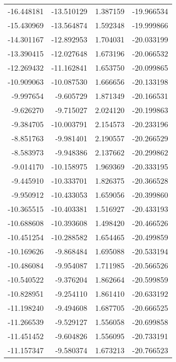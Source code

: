\begin{tabular}{rrrr}
      -16.448181 &       -13.510129 &    1.387159 & -19.966534 \\
      -15.430969 &       -13.564874 &    1.592348 & -19.999866 \\
      -14.301167 &       -12.892953 &    1.704031 & -20.033199 \\
      -13.390415 &       -12.027648 &    1.673196 & -20.066532 \\
      -12.269432 &       -11.162841 &    1.653750 & -20.099865 \\
      -10.909063 &       -10.087530 &    1.666656 & -20.133198 \\
       -9.997654 &        -9.605729 &    1.871349 & -20.166531 \\
       -9.626270 &        -9.715027 &    2.024120 & -20.199863 \\
       -9.384705 &       -10.003791 &    2.154573 & -20.233196 \\
       -8.851763 &        -9.981401 &    2.190557 & -20.266529 \\
       -8.583973 &        -9.948386 &    2.137662 & -20.299862 \\
       -9.014170 &       -10.158975 &    1.969369 & -20.333195 \\
       -9.445910 &       -10.333701 &    1.826375 & -20.366528 \\
       -9.950912 &       -10.433053 &    1.659056 & -20.399860 \\
      -10.365515 &       -10.403381 &    1.516927 & -20.433193 \\
      -10.688608 &       -10.393608 &    1.498420 & -20.466526 \\
      -10.451254 &       -10.288582 &    1.654465 & -20.499859 \\
      -10.169626 &        -9.868484 &    1.695088 & -20.533194 \\
      -10.486084 &        -9.954087 &    1.711985 & -20.566526 \\
      -10.540522 &        -9.376204 &    1.862664 & -20.599859 \\
      -10.828951 &        -9.254110 &    1.861410 & -20.633192 \\
      -11.198240 &        -9.494608 &    1.687705 & -20.666525 \\
      -11.266539 &        -9.529127 &    1.556058 & -20.699858 \\
      -11.451452 &        -9.604826 &    1.556095 & -20.733191 \\
      -11.157347 &        -9.580374 &    1.673213 & -20.766523 \\

\end{tabular}
